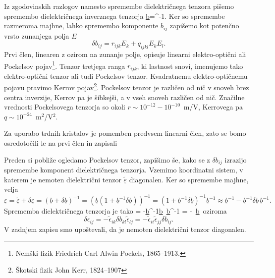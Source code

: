 Iz zgodovinskih razlogov namesto spremembe dielektričnega tenzora pišemo 
spremembo dielektričnega inverznega tenzorja 
\beq
\underline{b}=\underline{\epsilon}^{-1}.
\eeq
Ker so spremembe razmeroma majhne, lahko spremembo komponente $b_{ij}$ zapišemo 
kot potenčno vrsto zunanjega polja $E$
\begin{equation}
\delta b_{ij}=r_{ijk}E_{k}+q_{ijkl}E_{k}E_{l}.
\label{7.1}
\end{equation}
Prvi člen, linearen z ozirom na zunanje polje, opisuje linearni elektro-optični
ali Pockelsov pojav\footnote{Nemški fizik Friedrich Carl Alwin Pockels, 1865--1913.}. 
Tenzor tretjega ranga $r_{ijk}$, ki lastnost snovi, imenujemo tako elektro-optični tenzor 
ali tudi Pockelsov tenzor. Kvadratnemu elektro-optičnemu pojavu pravimo Kerrov 
pojav\footnote{Škotski fizik John Kerr, 1824--1907}. Pockelsov tenzor je 
različen od nič v snoveh brez centra inverzije, Kerrov pa je šibkejši, a v vseh snoveh
različen od nič. Značilne vrednosti Pockelsovega
tenzorja so okoli $r \sim 10^{-12} - 10^{-10}$~m/V, Kerrovega pa 
$q \sim 10^{-24}$~m$^2$/V$^2$.

Za uporabo trdnih kristalov je pomemben
predvsem linearni člen, zato se bomo osredotočili le na prvi člen in zapisali

Preden si pobliže ogledamo Pockelsov tenzor, zapišimo še,
kako se z $\delta b_{ij}$ izrazijo spremembe komponent dielektričnega
tenzorja. Vzemimo koordinatni sistem, v katerem je nemoten dielektrični
tenzor $\underline{\tilde{\varepsilon}}$ diagonalen. Ker so spremembe majhne, velja 
\begin{equation}
\underline{\varepsilon} = \underline{\tilde{\varepsilon}} + \delta \underline{\varepsilon}=
(\underline{b}+\delta \underline{b})^{-1}=\left(\underline{b}(1+\underline{b}^{-1}
\delta \underline{b})\right)^{-1}=(1+\underline{b}^{-1}\delta \underline{b})^{-1}\underline{b}^{-1}
\approx \underline{b}^{-1}-\underline{b}^{-1}\delta \underline{b}\, \underline{b}^{-1}.
\label{7.2}
\end{equation}
Sprememba dielektričnega tenzorja je tako
\beq
 \delta \underline{\varepsilon}= -\underline{b}^{-1}\delta \underline{b}\, \underline{b}^{-1}
 = -\underline{\tilde{\varepsilon}}\, \delta \underline{b}\, \underline{\tilde{\varepsilon}}
\eeq
oziroma
\begin{equation}
\delta\epsilon_{ij}=-\tilde{\epsilon}_{ik}\delta b_{kl}\tilde{\epsilon}_{lj}
=-\tilde{\epsilon}_{ii}\tilde{\epsilon}_{jj}\delta b_{ij}.
\label{7.3}
\end{equation}
V zadnjem zapisu smo upoštevali, da je nemoten dielektrični tenzor diagonalen.

